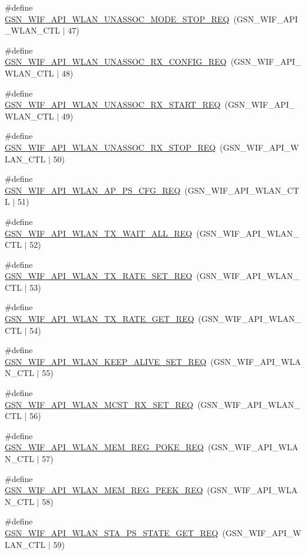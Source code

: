 \begin{DoxyCompactItemize}
\item 
\#define \hyperlink{a00606_af138445c1bd5c29a416711575f28f054}{GSN\_\-WIF\_\-API\_\-WLAN\_\-UNASSOC\_\-MODE\_\-STOP\_\-REQ}~(GSN\_\-WIF\_\-API\_\-WLAN\_\-CTL $|$ 47)
\item 
\#define \hyperlink{a00606_ab9c67f0a15ac24f03be0d69cfdc76f2d}{GSN\_\-WIF\_\-API\_\-WLAN\_\-UNASSOC\_\-RX\_\-CONFIG\_\-REQ}~(GSN\_\-WIF\_\-API\_\-WLAN\_\-CTL $|$ 48)
\item 
\#define \hyperlink{a00606_af768a3727f101af4d6dbee040a9df622}{GSN\_\-WIF\_\-API\_\-WLAN\_\-UNASSOC\_\-RX\_\-START\_\-REQ}~(GSN\_\-WIF\_\-API\_\-WLAN\_\-CTL $|$ 49)
\item 
\#define \hyperlink{a00606_ae32f5c6804303b9f5281f38db9605ab0}{GSN\_\-WIF\_\-API\_\-WLAN\_\-UNASSOC\_\-RX\_\-STOP\_\-REQ}~(GSN\_\-WIF\_\-API\_\-WLAN\_\-CTL $|$ 50)
\item 
\#define \hyperlink{a00606_ac6965464db6080ed747aa8ddcea38fa4}{GSN\_\-WIF\_\-API\_\-WLAN\_\-AP\_\-PS\_\-CFG\_\-REQ}~(GSN\_\-WIF\_\-API\_\-WLAN\_\-CTL $|$ 51)
\item 
\#define \hyperlink{a00606_aa834a28f1568a4ca8b78849f2c231bee}{GSN\_\-WIF\_\-API\_\-WLAN\_\-TX\_\-WAIT\_\-ALL\_\-REQ}~(GSN\_\-WIF\_\-API\_\-WLAN\_\-CTL $|$ 52)
\item 
\#define \hyperlink{a00606_a1bf24556a4e5c2d50882bde783ce8d11}{GSN\_\-WIF\_\-API\_\-WLAN\_\-TX\_\-RATE\_\-SET\_\-REQ}~(GSN\_\-WIF\_\-API\_\-WLAN\_\-CTL $|$ 53)
\item 
\#define \hyperlink{a00606_a1a64e2f0126971b7cb99d8449d403264}{GSN\_\-WIF\_\-API\_\-WLAN\_\-TX\_\-RATE\_\-GET\_\-REQ}~(GSN\_\-WIF\_\-API\_\-WLAN\_\-CTL $|$ 54)
\item 
\#define \hyperlink{a00606_a8a7ad08db4f5e8b8ed8d954a4ab164b1}{GSN\_\-WIF\_\-API\_\-WLAN\_\-KEEP\_\-ALIVE\_\-SET\_\-REQ}~(GSN\_\-WIF\_\-API\_\-WLAN\_\-CTL $|$ 55)
\item 
\#define \hyperlink{a00606_a4397129f559035aab5a5677031c160fa}{GSN\_\-WIF\_\-API\_\-WLAN\_\-MCST\_\-RX\_\-SET\_\-REQ}~(GSN\_\-WIF\_\-API\_\-WLAN\_\-CTL $|$ 56)
\item 
\#define \hyperlink{a00606_a68f6cdb031dae6063c330460e4f89acd}{GSN\_\-WIF\_\-API\_\-WLAN\_\-MEM\_\-REG\_\-POKE\_\-REQ}~(GSN\_\-WIF\_\-API\_\-WLAN\_\-CTL $|$ 57)
\item 
\#define \hyperlink{a00606_af4bb9564cfec03082d7dc43e668df779}{GSN\_\-WIF\_\-API\_\-WLAN\_\-MEM\_\-REG\_\-PEEK\_\-REQ}~(GSN\_\-WIF\_\-API\_\-WLAN\_\-CTL $|$ 58)
\item 
\#define \hyperlink{a00606_af3dcd23f15d05b842c5d9b2c26edc0cc}{GSN\_\-WIF\_\-API\_\-WLAN\_\-STA\_\-PS\_\-STATE\_\-GET\_\-REQ}~(GSN\_\-WIF\_\-API\_\-WLAN\_\-CTL $|$ 59)

\end{DoxyCompactItemize}
